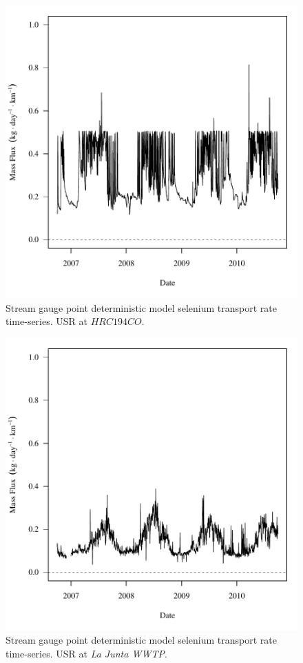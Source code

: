 \begin{figure}[htbp]
	\begin{center}
	\includegraphics[width=6in]{"Figures/Results_DUSR/f HRC"}
	\caption{Stream gauge point deterministic model selenium transport rate time-series.  USR at $HRC194CO$.}
	\end{center}
\end{figure}
\newpage

\begin{figure}[htbp]
	\begin{center}
	\includegraphics[width=6in]{"Figures/Results_DUSR/f WTP"}
	\caption{Stream gauge point deterministic model selenium transport rate time-series.  USR at \textit{La Junta WWTP}.}
	\end{center}
\end{figure}
\newpage

